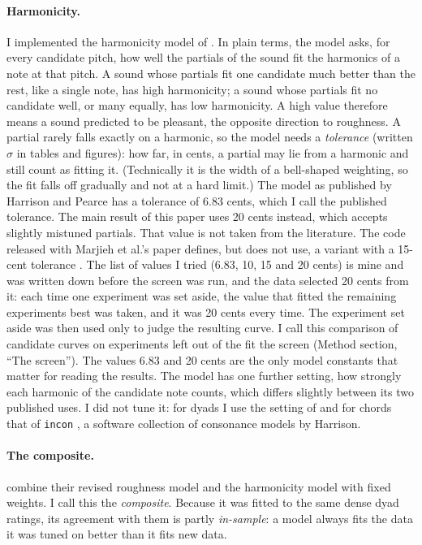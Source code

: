 \documentclass[11pt,a4paper]{article}
\begin{document}
\paragraph{Harmonicity.}
I implemented the harmonicity model of \citet{harrison2018,harrison2020}. In plain terms,
the model asks, for every candidate pitch, how well the partials of the sound fit the
harmonics of a note at that pitch. A sound whose partials fit one candidate much better than
the rest, like a single note, has high harmonicity; a sound whose partials fit no candidate
well, or many equally, has low harmonicity. A high value therefore means a sound predicted
to be pleasant, the opposite direction to roughness. A partial rarely falls exactly on a
harmonic, so the model needs a \emph{tolerance} (written $\sigma$ in tables and figures): how far, in cents, a partial may lie from a
harmonic and still count as fitting it. (Technically it is the width of a bell-shaped
weighting, so the fit falls off gradually and not at a hard limit.) The model as published by Harrison and Pearce
has a tolerance of 6.83 cents, which I call the published tolerance. The main result of this
paper uses 20 cents instead, which accepts slightly mistuned partials. That value is not
taken from the literature. The code released with Marjieh et al.'s paper defines, but does not
use, a variant with a 15-cent tolerance \citep{marjieh2024code}. The list of values I tried
(6.83, 10, 15 and 20 cents) is mine and was written down before the screen was run, and the data selected 20 cents
from it: each time one experiment was set aside, the value that fitted the remaining
experiments best was taken, and it was 20 cents every time. The experiment set aside was then
used only to judge the resulting curve. I call this comparison of candidate curves on
experiments left out of the fit the screen (Method section, ``The screen'').
The values 6.83 and 20 cents are the only model constants that matter for reading the
results. The model
has one further setting, how strongly each harmonic of the candidate note counts, which
differs slightly between its two published uses. I did not tune it: for dyads I use the
setting of \citet{marjieh2024} and for chords that of \texttt{incon} \citep{incon}, a software collection of consonance models by Harrison.

\paragraph{The composite.}
\citet{marjieh2024} combine their revised roughness model and the harmonicity model with
fixed weights. I call this the \emph{composite}. Because it was fitted to the same dense dyad
ratings, its agreement with them is partly \emph{in-sample}: a model always fits the data it
was tuned on better than it fits new data.
\end{document}
